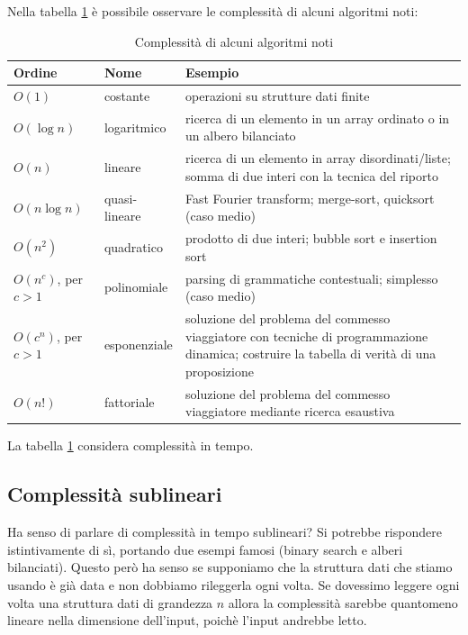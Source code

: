 Nella tabella \ref{algocomp} è possibile osservare le complessità di alcuni algoritmi noti:
\begin{table}[h]
    \begin{tabular}{|l|l|p{7cm}|}
        \hline
        \textbf{Ordine} & \textbf{Nome} & \textbf{Esempio} \\
        \hline
        $O(1)$ & costante & operazioni su strutture dati finite \\
        \hline
        $O(\log n)$ & logaritmico & ricerca di un elemento in un array ordinato o in un albero
        bilanciato \\
        \hline
        $O(n)$ & lineare & ricerca di un elemento in array disordinati/liste; somma di due interi con la
        tecnica del riporto\\
        \hline
        $O(n\log n)$ & quasi-lineare & Fast Fourier transform; merge-sort, quicksort (caso medio)\\
        \hline
        $O(n^{2})$ & quadratico & prodotto di due interi; bubble sort e insertion sort \\
        \hline
        $O(n^{c})$, per $c > 1$ & polinomiale & parsing di grammatiche contestuali; simplesso (caso
        medio)\\
        \hline
        $O(c^{n})$, per $c > 1$ & esponenziale & soluzione del problema del commesso viaggiatore con
        tecniche di programmazione dinamica; costruire la tabella di verità di una proposizione \\
        \hline
        $O(n!)$ & fattoriale & soluzione del problema del commesso viaggiatore mediante ricerca esaustiva \\
        \hline
    \end{tabular}
    \caption{Complessità di alcuni algoritmi noti}
    \label{algocomp}
\end{table}

La tabella \ref{algocomp} considera complessità in tempo.

\subsection{Complessità sublineari}

Ha senso di parlare di complessità in tempo sublineari? Si potrebbe rispondere istintivamente di sì,
portando due esempi famosi (binary search e alberi bilanciati). Questo però ha senso se supponiamo
che la struttura dati che stiamo usando è già data e non dobbiamo rileggerla ogni volta. Se
dovessimo leggere ogni volta una struttura dati di grandezza $n$ allora la complessità sarebbe
quantomeno lineare nella dimensione dell'input, poichè l'input andrebbe letto.

